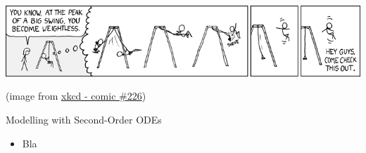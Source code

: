 %
%


\begin{topic}



\vfil

\begin{center}
\begin{minipage}{500pt}
	\includegraphics*[width=500pt]{images/chap4-xkcd.png}

	\hfill {\footnotesize (image from \href{https://www.xkcd.com/226/}{xkcd - comic \#226})}
\end{minipage}
\end{center}


\end{topic}












%
%



\begin{module}{Modelling with Second-Order ODEs}
	\label{2nd:model}

	
	
\end{module}



\begin{lesson}

	\begin{itemize}
		\item Bla
	\end{itemize}
	

\end{lesson}




